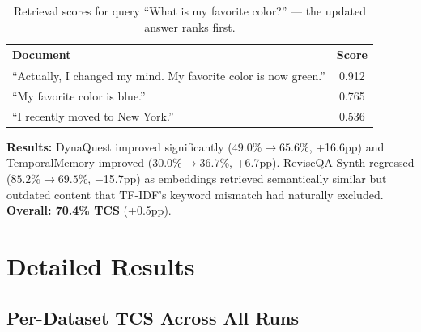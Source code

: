 \documentclass[11pt,a4paper]{article}
\begin{document}
\begin{table}[H]
\centering
\small
\begin{tabular}{lc}
\toprule
\textbf{Document} & \textbf{Score} \\
\midrule
``Actually, I changed my mind. My favorite color is now green.'' & 0.912 \\
``My favorite color is blue.'' & 0.765 \\
``I recently moved to New York.'' & 0.536 \\
\bottomrule
\end{tabular}
\caption{Retrieval scores for query ``What is my favorite color?'' ---
the updated answer ranks first.}
\end{table}

\textbf{Results:}
DynaQuest improved significantly ($49.0\% \to 65.6\%$, +16.6pp) and
TemporalMemory improved ($30.0\% \to 36.7\%$, +6.7pp).  ReviseQA-Synth
regressed ($85.2\% \to 69.5\%$, $-$15.7pp) as embeddings retrieved
semantically similar but outdated content that TF-IDF's keyword mismatch
had naturally excluded.  \textbf{Overall: 70.4\% TCS} (+0.5pp).


\section{Detailed Results}
\label{sec:detailed}

\subsection{Per-Dataset TCS Across All Runs}
\end{document}
